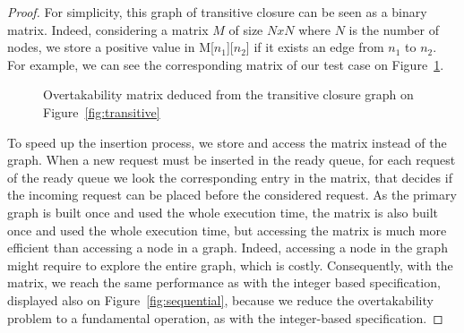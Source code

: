 \documentclass[11pt]{report}
\begin{document}
\begin{proof}
For simplicity, this graph of transitive closure can be seen as a binary matrix. Indeed, considering a matrix $M$ of size $NxN$ where $N$ is the number of nodes, we store a positive value in M[$n_1$][$n_2$] if it exists an edge from $n_1$ to $n_2$. For example, we can see the corresponding matrix of our test case on Figure~\ref{fig:matrix}.
\begin{figure}[!ht]
      \caption{Overtakability matrix deduced from the transitive closure graph on Figure~\ref{fig:transitive}}
      \label{fig:matrix} 
\end{figure}
To speed up the insertion process, we store and access the matrix instead of the graph. When a new request must be inserted in the ready queue, for each request of the ready queue we look the corresponding entry in the matrix, that decides if the incoming request can be placed before the considered request. 
As the primary graph is built once and used the whole execution time, the matrix is also built once and used the whole execution time, but accessing the matrix is much more efficient than accessing a node in a graph. Indeed, accessing a node in the graph might require to explore the entire graph, which is costly.
Consequently, with the matrix, we reach the same performance as with the integer based specification, displayed also on Figure~\ref{fig:sequential}, because we reduce the overtakability problem to a fundamental operation, as with the integer-based specification.


\end{proof}
\end{document}

